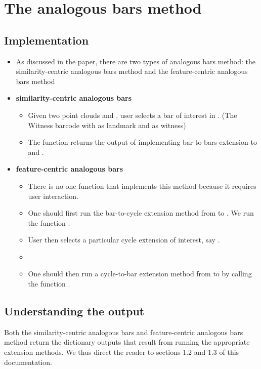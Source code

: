 \documentclass{article}
\begin{document}
\section{The analogous bars method}

\subsection{Implementation}
\begin{itemize}
\item As discussed in the paper, there are two types of analogous bars method: the similarity-centric analogous bars method and the feature-centric analogous bars method
\item \textbf{similarity-centric analogous bars}
	\begin{itemize}
	\item Given two point clouds  and , user selects a bar of interest in . (The Witness barcode with  as landmark and  as witness) 
	\item The function returns the output of implementing bar-to-bars extension to  and .
	\end{itemize}
\item \textbf{feature-centric analogous bars}
	\begin{itemize}
	\item There is no one function that implements this method because it requires user interaction.
	\item One should first run the bar-to-cycle extension method from  to . We run the function . 
	\item User then selects a particular cycle extension of interest, say .
	\item %
	\item One should then run a cycle-to-bar extension method from  to  by calling the function .	
	\end{itemize}
\end{itemize}

\subsection{Understanding the output}
Both the similarity-centric analogous bars and feature-centric analogous bars method return the dictionary outputs that result from running the appropriate extension methods. We thus direct the reader to sections 1.2 and 1.3 of this documentation. 
\end{document}
